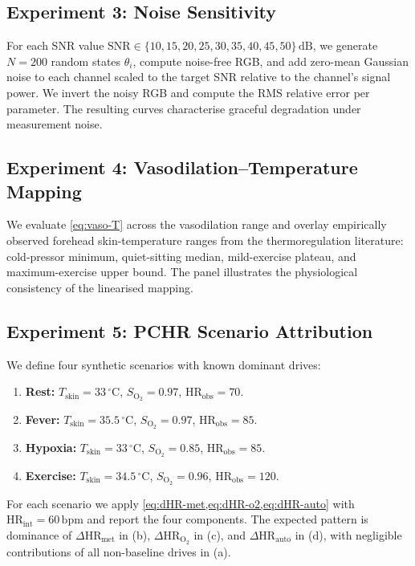 \documentclass[10pt,twocolumn,a4paper]{article}
\theoremstyle{definition}
\newcommand{\Tskin}{T_{\mathrm{skin}}}
\newcommand{\HRobs}{\mathrm{HR}_{\mathrm{obs}}}
\newcommand{\HRint}{\mathrm{HR}_{\mathrm{int}}}
\newcommand{\dHRm}{\Delta\mathrm{HR}_{\mathrm{met}}}
\newcommand{\dHRo}{\Delta\mathrm{HR}_{\mathrm{O_2}}}
\newcommand{\dHRa}{\Delta\mathrm{HR}_{\mathrm{auto}}}
\newcommand{\Soxy}{S_{\mathrm{O_2}}}
\begin{document}
\subsection{Experiment 3: Noise Sensitivity}

For each SNR value
$\mathrm{SNR}\in\{10,15,20,25,30,35,40,45,50\}\,\mathrm{dB}$, we
generate $N=200$ random states $\theta_{i}$, compute noise-free RGB,
and add zero-mean Gaussian noise to each channel scaled to the target
SNR relative to the channel's signal power. We invert the noisy RGB
and compute the RMS relative error per parameter. The resulting
curves characterise graceful degradation under measurement noise.

\subsection{Experiment 4: Vasodilation--Temperature Mapping}

We evaluate \cref{eq:vaso-T} across the vasodilation range and overlay
empirically observed forehead skin-temperature ranges from the
thermoregulation literature: cold-pressor minimum, quiet-sitting
median, mild-exercise plateau, and maximum-exercise upper bound. The
panel illustrates the physiological consistency of the linearised
mapping.

\subsection{Experiment 5: PCHR Scenario Attribution}

We define four synthetic scenarios with known dominant drives:
\begin{enumerate}[label=(\alph*),nosep]
\item \textbf{Rest:} $\Tskin=33\,^{\circ}\mathrm{C}$,
  $\Soxy=0.97$, $\HRobs=70$.
\item \textbf{Fever:} $\Tskin=35.5\,^{\circ}\mathrm{C}$,
  $\Soxy=0.97$, $\HRobs=85$.
\item \textbf{Hypoxia:} $\Tskin=33\,^{\circ}\mathrm{C}$,
  $\Soxy=0.85$, $\HRobs=85$.
\item \textbf{Exercise:} $\Tskin=34.5\,^{\circ}\mathrm{C}$,
  $\Soxy=0.96$, $\HRobs=120$.
\end{enumerate}
For each scenario we apply
\cref{eq:dHR-met,eq:dHR-o2,eq:dHR-auto} with $\HRint=60\,\mathrm{bpm}$
and report the four components. The expected pattern is dominance of
$\dHRm$ in (b), $\dHRo$ in (c), and $\dHRa$ in (d), with negligible
contributions of all non-baseline drives in (a).
\end{document}
